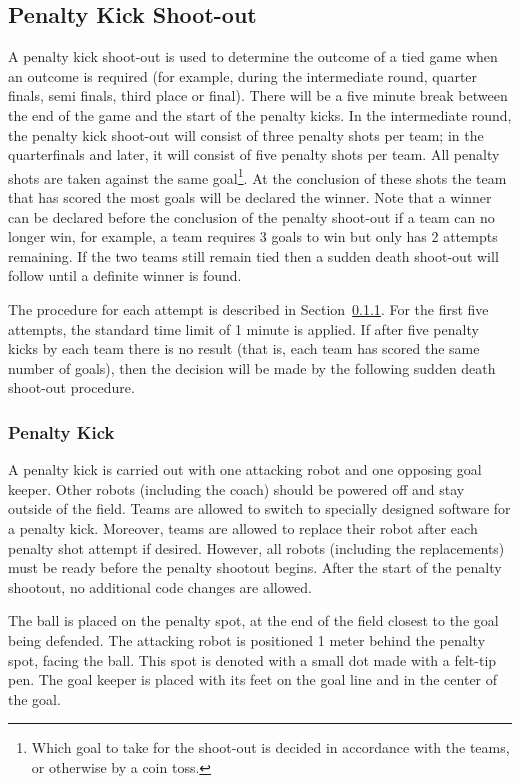 \documentclass[12pt]{article}
\begin{document}
\subsection{Penalty Kick Shoot-out}
\label{sec:penalty_shoot-out}

A penalty kick shoot-out is used to determine the outcome of a tied game when an outcome is required (for example, during the intermediate round, quarter finals, semi finals, third place or final). 
There will be a five minute break between the end of the game and the start of the penalty kicks.
In the intermediate round, the penalty kick shoot-out will consist of three penalty shots per team; in the quarterfinals and later, it will consist of five penalty shots per team.
All penalty shots are taken against the same goal\footnote{Which goal to take for the shoot-out is decided in accordance with the teams, or otherwise by a coin toss.}. At the conclusion of these shots the team that has scored the most goals will be declared the winner. Note that a winner can be declared before the conclusion of the penalty shoot-out if a team can no longer win, for example, a team requires 3 goals to win but only has 2 attempts remaining. If the two teams still remain tied then a sudden death shoot-out will follow until a definite winner is found.

The procedure for each attempt is described in Section~\ref{sec:penalty_kick}. For the first five attempts, the standard time limit of 1 minute is applied. If after five penalty kicks by each team there is no result (that is, each team has scored the same number of goals), then the decision will be made by the following sudden death shoot-out procedure.

\subsubsection{Penalty Kick}
\label{sec:penalty_kick}

A penalty kick is carried out with one attacking robot and one opposing goal keeper. Other robots (including the coach) should be powered off and stay outside of the field. Teams are allowed to switch to specially designed software for a penalty kick.  Moreover, teams are allowed to replace their robot after each penalty shot attempt if desired.  However, all robots (including the replacements) must be ready before the penalty shootout begins. After the start of the penalty shootout, no additional code changes are allowed.

The ball is placed on the penalty spot, at the end of the field closest to the goal being defended. The attacking robot is positioned 1 meter behind the penalty spot, facing the ball.  This spot is denoted with a small dot made with a felt-tip pen. The goal keeper is placed with its feet on the goal line and in the center of the goal.
\end{document}
